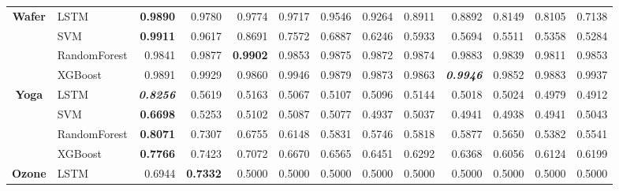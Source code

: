 \begin{table}[H]
\begin{adjustbox}{max width=12cm}
\begin{tabular}{|c|l|r|r|r|r|r|r|r|r|r|r|r|}
			\hline
			\textbf{Wafer}        & LSTM         & \textbf{0.9890}          & 0.9780                   & 0.9774          & 0.9717 & 0.9546          & 0.9264                   & 0.8911                   & 0.8892                   & 0.8149 & 0.8105                   & 0.7138          \\
			                      & SVM          & \textbf{0.9911}          & 0.9617                   & 0.8691          & 0.7572 & 0.6887          & 0.6246                   & 0.5933                   & 0.5694                   & 0.5511 & 0.5358                   & 0.5284          \\
			                      & RandomForest & 0.9841                   & 0.9877                   & \textbf{0.9902} & 0.9853 & 0.9875          & 0.9872                   & 0.9874                   & 0.9883                   & 0.9839 & 0.9811                   & 0.9853          \\
			                      & XGBoost      & 0.9891                   & 0.9929                   & 0.9860          & 0.9946 & 0.9879          & 0.9873                   & 0.9863                   & \textit{\textbf{0.9946}} & 0.9852 & 0.9883                   & 0.9937          \\
			\hline
			\textbf{Yoga}         & LSTM         & \textit{\textbf{0.8256}} & 0.5619                   & 0.5163          & 0.5067 & 0.5107          & 0.5096                   & 0.5144                   & 0.5018                   & 0.5024 & 0.4979                   & 0.4912          \\
			                      & SVM          & \textbf{0.6698}          & 0.5253                   & 0.5102          & 0.5087 & 0.5077          & 0.4937                   & 0.5037                   & 0.4941                   & 0.4938 & 0.4941                   & 0.5043          \\
			                      & RandomForest & \textbf{0.8071}          & 0.7307                   & 0.6755          & 0.6148 & 0.5831          & 0.5746                   & 0.5818                   & 0.5877                   & 0.5650 & 0.5382                   & 0.5541          \\
			                      & XGBoost      & \textbf{0.7766}          & 0.7423                   & 0.7072          & 0.6670 & 0.6565          & 0.6451                   & 0.6292                   & 0.6368                   & 0.6056 & 0.6124                   & 0.6199          \\
			\hline
			\textbf{Ozone}        & LSTM         & 0.6944                   & \textbf{0.7332}          & 0.5000          & 0.5000 & 0.5000          & 0.5000                   & 0.5000                   & 0.5000                   & 0.5000 & 0.5000                   & 0.5000          \\

\end{tabular}
\end{adjustbox}
\end{table}
